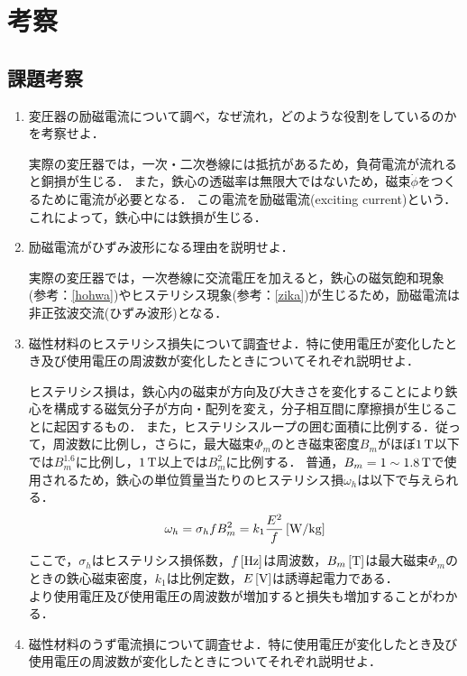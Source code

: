 \clearpage

\section{考察}
\subsection{課題考察}
\begin{enumerate}[1.]
	\item 変圧器の励磁電流について調べ，なぜ流れ，どのような役割をしているのかを考察せよ．\cite{1130282270091029760}
	
	実際の変圧器では，一次・二次巻線には抵抗があるため，負荷電流が流れると銅損が生じる．
	また，鉄心の透磁率は無限大ではないため，磁束$\dot{\phi}$をつくるために電流が必要となる．
	この電流を励磁電流(exciting current)という．
	これによって，鉄心中には鉄損が生じる．
	\item 励磁電流がひずみ波形になる理由を説明せよ．
	
	実際の変圧器では，一次巻線に交流電圧を加えると，鉄心の磁気飽和現象(参考：\ref{hohwa})やヒステリシス現象(参考：\ref{zika})が生じるため，励磁電流は非正弦波交流(ひずみ波形)となる\cite{1130282270091029760}．
	\item 磁性材料のヒステリシス損失について調査せよ．特に使用電圧が変化したとき及び使用電圧の周波数が変化したときについてそれぞれ説明せよ．\cite{11302822718577152}
	\label{hlos}
	
	ヒステリシス損は，鉄心内の磁束が方向及び大きさを変化することにより鉄心を構成する磁気分子が方向・配列を変え，分子相互間に摩擦損が生じることに起因するもの．
	また，ヒステリシスループの囲む面積に比例する．従って，周波数に比例し，さらに，最大磁束$\Phi_{m}$のとき磁束密度$B_{m}$がほぼ$1\,\rm{T}$以下では$B_{m}^{1.6}$に比例し，$1\,\rm{T}$以上では$B_{m}^{2}$に比例する．
	普通，$B_{m}=1 \sim 1.8\,\rm{T}$で使用されるため，鉄心の単位質量当たりのヒステリシス損$\omega_{h}$は以下で与えられる．
	\begin{equation}
		\omega_{h}=\sigma_{h}fB_{m}^{2}=k_{1}\frac{E^{2}}{f}\,[\rm{W/kg}]
		\label{eq:he}
	\end{equation}
	ここで，$\sigma_{h}$はヒステリシス損係数，$f\,[\rm{Hz}]$は周波数，$B_{m}\,[\rm{T}]$は最大磁束$\Phi_{m}$のときの鉄心磁束密度，$k_{1}$は比例定数，$E\,[\rm{V}]$は誘導起電力である．\\
	より使用電圧及び使用電圧の周波数が増加すると損失も増加することがわかる．
	\item 磁性材料のうず電流損について調査せよ．特に使用電圧が変化したとき及び使用電圧の周波数が変化したときについてそれぞれ説明せよ．\cite{11302822718577152}
	\label{uzu}
	

\end{enumerate}
